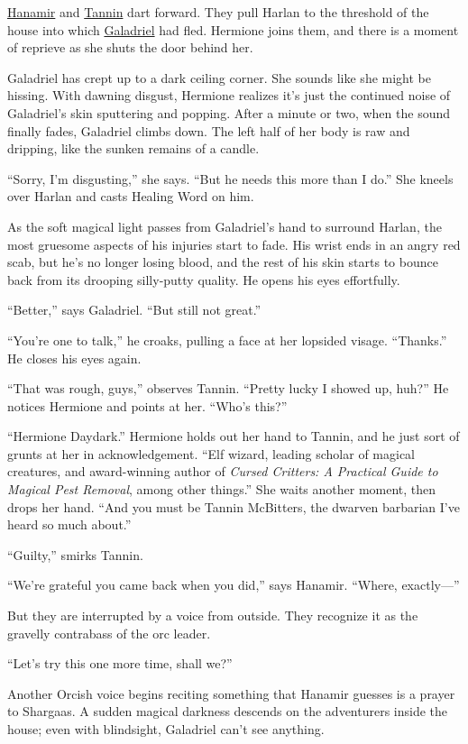 \documentclass[smalldemyvopaper,11pt,twoside,onecolumn,openright,extrafontsizes]{memoir}
\newlength\drop
\begin{document}
\href{/characters/hanamir/}{Hanamir} and
\href{/characters/tannin/}{Tannin} dart forward. They pull Harlan to the
threshold of the house into which
\href{/characters/galadriel/}{Galadriel} had fled. Hermione joins them,
and there is a moment of reprieve as she shuts the door behind her.

Galadriel has crept up to a dark ceiling corner. She sounds like she
might be hissing. With dawning disgust, Hermione realizes it's just the
continued noise of Galadriel's skin sputtering and popping. After a
minute or two, when the sound finally fades, Galadriel climbs down. The
left half of her body is raw and dripping, like the sunken remains of a
candle.

``Sorry, I'm disgusting,'' she says. ``But he needs this more than I
do.'' She kneels over Harlan and casts Healing Word on him.

As the soft magical light passes from Galadriel's hand to surround
Harlan, the most gruesome aspects of his injuries start to fade. His
wrist ends in an angry red scab, but he's no longer losing blood, and
the rest of his skin starts to bounce back from its drooping silly-putty
quality. He opens his eyes effortfully.

``Better,'' says Galadriel. ``But still not great.''

``You're one to talk,'' he croaks, pulling a face at her lopsided
visage. ``Thanks.'' He closes his eyes again.

``That was rough, guys,'' observes Tannin. ``Pretty lucky I showed up,
huh?'' He notices Hermione and points at her. ``Who's this?''

``Hermione Daydark.'' Hermione holds out her hand to Tannin, and he just
sort of grunts at her in acknowledgement. ``Elf wizard, leading scholar
of magical creatures, and award-winning author of \emph{Cursed Critters:
A Practical Guide to Magical Pest Removal}, among other things.'' She
waits another moment, then drops her hand. ``And you must be Tannin
McBitters, the dwarven barbarian I've heard so much about.''

``Guilty,'' smirks Tannin.

``We're grateful you came back when you did,'' says Hanamir. ``Where,
exactly---''

But they are interrupted by a voice from outside. They recognize it as
the gravelly contrabass of the orc leader.

``Let's try this one more time, shall we?''

Another Orcish voice begins reciting something that Hanamir guesses is a
prayer to Shargaas. A sudden magical darkness descends on the
adventurers inside the house; even with blindsight, Galadriel can't see
anything.
\end{document}
